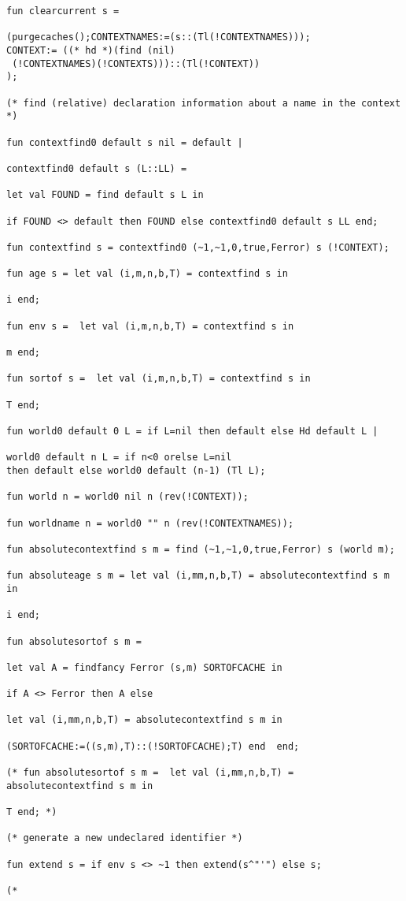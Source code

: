 \documentclass[12pt]{article}
\begin{document}
\begin{verbatim}
fun clearcurrent s =

(purgecaches();CONTEXTNAMES:=(s::(Tl(!CONTEXTNAMES)));
CONTEXT:= ((* hd *)(find (nil)
 (!CONTEXTNAMES)(!CONTEXTS)))::(Tl(!CONTEXT))
);

(* find (relative) declaration information about a name in the context *)

fun contextfind0 default s nil = default |

contextfind0 default s (L::LL) = 

let val FOUND = find default s L in

if FOUND <> default then FOUND else contextfind0 default s LL end;

fun contextfind s = contextfind0 (~1,~1,0,true,Ferror) s (!CONTEXT);

fun age s = let val (i,m,n,b,T) = contextfind s in

i end;

fun env s =  let val (i,m,n,b,T) = contextfind s in

m end;

fun sortof s =  let val (i,m,n,b,T) = contextfind s in

T end;

fun world0 default 0 L = if L=nil then default else Hd default L |

world0 default n L = if n<0 orelse L=nil 
then default else world0 default (n-1) (Tl L);

fun world n = world0 nil n (rev(!CONTEXT));

fun worldname n = world0 "" n (rev(!CONTEXTNAMES));

fun absolutecontextfind s m = find (~1,~1,0,true,Ferror) s (world m);

fun absoluteage s m = let val (i,mm,n,b,T) = absolutecontextfind s m in

i end;

fun absolutesortof s m =  

let val A = findfancy Ferror (s,m) SORTOFCACHE in

if A <> Ferror then A else 

let val (i,mm,n,b,T) = absolutecontextfind s m in

(SORTOFCACHE:=((s,m),T)::(!SORTOFCACHE);T) end  end;

(* fun absolutesortof s m =  let val (i,mm,n,b,T) = absolutecontextfind s m in

T end; *)

(* generate a new undeclared identifier *)

fun extend s = if env s <> ~1 then extend(s^"'") else s;

(*

\end{verbatim}
\end{document}

